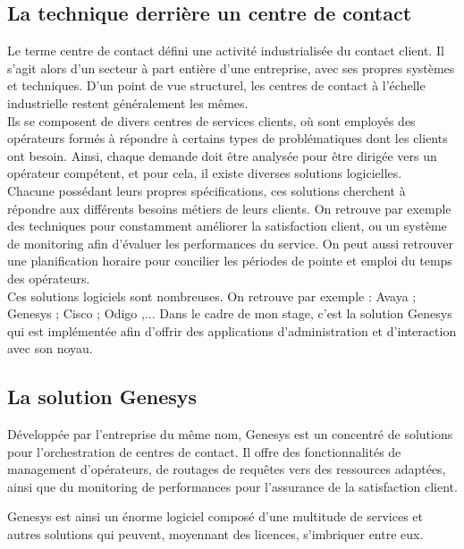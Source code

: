 \documentclass{rapport}
\begin{document}
\subsection{La technique derrière un centre de contact}

Le terme centre de contact défini une activité industrialisée du contact client. Il s'agit alors d'un secteur à part entière d'une entreprise, avec ses propres systèmes et techniques.
D'un point de vue structurel, les centres de contact à l'échelle industrielle restent généralement les mêmes.\\

Ils se composent de divers centres de services clients, où sont employés des opérateurs formés à répondre à certains types de problématiques dont les clients ont besoin. Ainsi, chaque demande doit être analysée pour être dirigée vers un opérateur compétent, et pour cela, il existe diverses solutions logicielles.\\

Chacune possédant leurs propres spécifications, ces solutions cherchent à répondre aux différents besoins métiers de leurs clients.
On retrouve par exemple des techniques pour constamment améliorer la satisfaction client, ou un système de monitoring afin d'évaluer les performances du service. On peut aussi retrouver une planification horaire pour concilier les périodes de pointe et emploi du temps des opérateurs.\\

Ces solutions logiciels sont nombreuses. On retrouve par exemple :
Avaya ; Genesys ; Cisco ; Odigo ,...
Dans le cadre de mon stage, c'est la solution Genesys qui est implémentée afin d'offrir des applications d'administration et d'interaction avec son noyau.

\subsection{La solution Genesys}

Développée par l'entreprise du même nom, Genesys est un concentré de solutions pour l'orchestration de centres de contact. Il offre des fonctionnalités de management d'opérateurs, de routages de requêtes vers des ressources adaptées, ainsi que du monitoring de performances pour l'assurance de la satisfaction client.\\


Genesys est ainsi un énorme logiciel composé d'une multitude de services et autres solutions qui peuvent, moyennant des licences, s'imbriquer entre eux.\\
\end{document}
